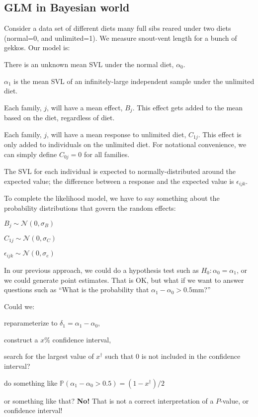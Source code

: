 \documentclass[11pt]{article}
\renewcommand{\Pr}{{\mathbb P}}
\begin{document}
\subsection*{GLM in Bayesian world}
Consider a data set of different diets many full sibs reared under two diets (normal=0, and unlimited=1).
We measure snout-vent length for a bunch of gekkos.
Our model is:
\begin{compactitem}
	\item There is an unknown mean SVL under the normal diet, $\alpha_0$.
	\item $\alpha_1$ is the mean SVL of an infinitely-large independent sample under the unlimited diet.
	\item Each family, $j$, will have a mean effect, $B_j$. This effect gets added to the mean based on the diet, regardless of diet.
	\item Each family, $j$, will have a mean response to unlimited diet, $C_{1j}$. This effect is only added to individuals on the unlimited diet. For notational convenience, we can simply define $C_{0j}=0$ for all families.
	\item The SVL for each individual is expected to normally-distributed around the expected value; the difference between a response and the expected value is $\epsilon_{ijk}$.
\end{compactitem}
To complete the likelihood model, we have to say something about the probability distributions that govern the random effects:
\begin{compactitem}
	\item $B_j \sim \mathcal{N}(0, \sigma_B)$
	\item $C_{1j} \sim \mathcal{N}(0, \sigma_C)$
	\item $\epsilon_{ijk} \sim \mathcal{N}(0, \sigma_e)$
\end{compactitem}

In our previous approach, we could do a hypothesis test such as $H_0: \alpha_0 = \alpha_1$, or we could generate point estimates.
That is OK, but what if we want to answer questions such as ``What is the probability that $\alpha_1 - \alpha_0 > 0.5$mm?''

Could we:
\begin{compactitem}
	\item reparameterize to $\delta_1 = \alpha_1 - \alpha_0$,
	\item construct a $x\%$ confidence interval,
	\item search for the largest value of $x^{\dag}$ such that 0 is not included in the confidence interval?
	\item do something like $\Pr(\alpha_1 - \alpha_0 > 0.5) = (1-x^{\dag})/2$
\end{compactitem}
or something like that? {\bf No!} That is not a correct interpretation of a $P$-value, or confidence interval!
\end{document}

